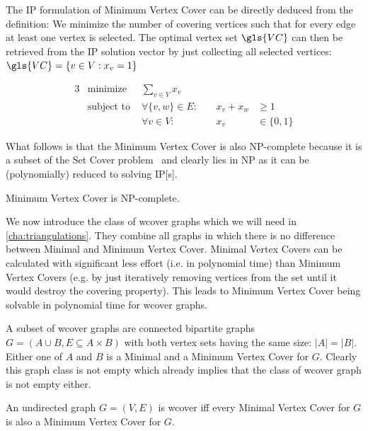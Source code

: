 The \gls{IP} formulation of Minimum Vertex Cover can be directly
deduced from the definition: We minimize the number of covering
vertices such that for every edge at least one vertex is selected. The
optimal vertex set \(\gls{VC}\) can then be retrieved from the
\gls{IP} solution vector by just collecting all selected vertices:
\( \gls{VC} = \{v \in V : x_v = 1\} \)

\begin{problem}
  \begin{alignat*}{3}
    &\text{minimize } & \sum\limits_{v \in V} x_v \\
    &\text{subject to } & \forall \{v,w\} \in E : &~& x_v + x_w &\geq 1 \\
    && \forall v \in V : &~& x_v &\in \{0,1\}
  \end{alignat*}
\end{problem}

What follows is that the Minimum Vertex Cover is also NP-complete
because it is a subset of the Set Cover
problem~\cite{karp_np_complete} and clearly lies in NP as it can be
(polynomially) reduced to solving \gls{IP}[s].

\begin{theorem}
  \label{thm:minimum_vertex_cover_complexity}
  Minimum Vertex Cover is NP-complete.~\cite{karp_np_complete}
\end{theorem}

We now introduce the class of \gls{wcover} graphs which we will need
in \cref{cha:triangulations}. They combine all graphs in which there
is no difference between Minimal and Minimum Vertex Cover. Minimal
Vertex Covers can be calculated with significant less effort (i.e. 
in polynomial time) than Minimum Vertex Covers (e.g. by just
iteratively removing vertices from the set until it would destroy the
covering property). This leads to Minimum Vertex Cover being solvable
in polynomial time for \gls{wcover} graphs.

A subset of \gls{wcover} graphs are connected bipartite graphs
\(G=(A \cup B,E \subseteq A \times B)\) with both vertex sets having
the same size: \(|A|=|B|\). Either one of \(A\) and \(B\) is a Minimal
and a Minimum Vertex Cover for \(G\). Clearly this graph class is not
empty which already implies that the class of \gls{wcover} graph is
not empty either.

\begin{definition}
  \label{def:well_covered}
  An undirected graph \(G=(V,E)\) is \gls{wcover} iff every Minimal
  Vertex Cover for \(G\) is also a Minimum Vertex Cover for \(G\).
  \cite{graph_well_covered}
\end{definition}

